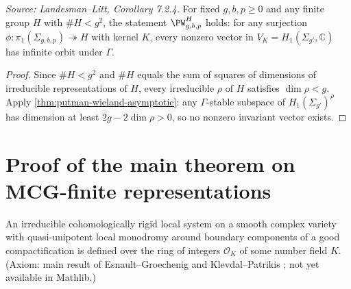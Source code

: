 \begin{corollary}
  \label{cor:putman-wieland-small-H}
  \textit{Source: Landesman--Litt, Corollary 7.2.4.}
  For fixed $g, b, p \geq 0$ and any finite group $H$ with $\#H < g^2$, the
  statement $\PW_{g,b,p}^H$ holds: for any surjection
  $\phi\colon \pi_1(\Sigma_{g,b,p}) \twoheadrightarrow H$ with kernel $K$, every
  nonzero vector in $V_K = H_1(\Sigma_{g'}, \mathbb{C})$ has infinite orbit
  under $\Gamma$.
\end{corollary}

\begin{proof}
  Since $\#H < g^2$ and $\#H$ equals the sum of squares of dimensions of
  irreducible representations of $H$, every irreducible $\rho$ of $H$
  satisfies $\dim\rho < g$.
  Apply \cref{thm:putman-wieland-asymptotic}: any $\Gamma$-stable subspace of
  $H_1(\Sigma_{g'})^\rho$ has dimension at least $2g - 2\dim\rho > 0$, so
  no nonzero invariant vector exists.
\end{proof}

\section{Proof of the main theorem on MCG-finite representations}


\begin{theorem}
  \label{thm:cohomologically-rigid-integral}
  An irreducible cohomologically rigid local system on a smooth complex variety
  with quasi-unipotent local monodromy around boundary components of a good
  compactification is defined over the ring of integers $\mathcal{O}_K$ of some
  number field $K$.
  (Axiom: main result of Esnault--Groechenig \cite{esnault2018cohomologically}
  and Klevdal--Patrikis \cite{klevdalP:g-rigid-local-systems-are-integral};
  not yet available in Mathlib.)
\end{theorem}


